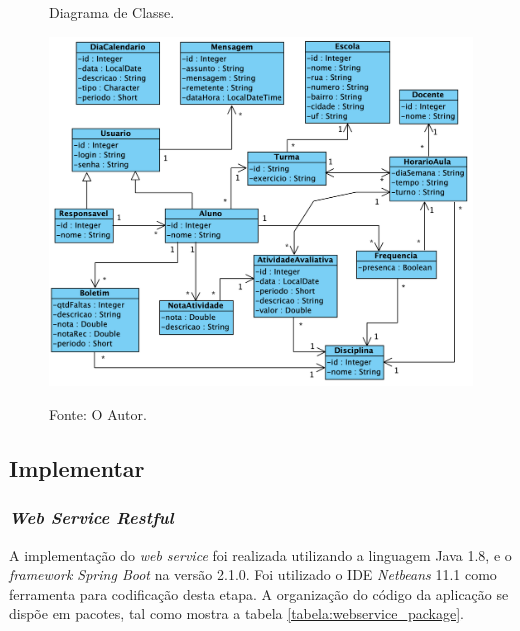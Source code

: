 \begin{figure}[H]
	\caption{Diagrama de Classe.}
	\centering %
	\includegraphics[width=16cm]{resources/classes_projeto.png} %
	\label{figura:diagrama_classe}
	\captionsetup{singlelinecheck = false, format= hang, justification=raggedright, labelsep=space, width=16cm}
	\caption*{\footnotesize Fonte: O Autor.}
\end{figure}

\subsection{Implementar}

\subsubsection{\textit{Web Service Restful}}

A implementação do \textit{web service} foi realizada utilizando a linguagem Java 1.8, e o \textit{framework Spring Boot} na versão 2.1.0. Foi utilizado o IDE \textit{Netbeans} 11.1 como ferramenta para codificação desta etapa. A organização do código da aplicação se dispõe em pacotes, tal como mostra a tabela \ref{tabela:webservice_package}.

